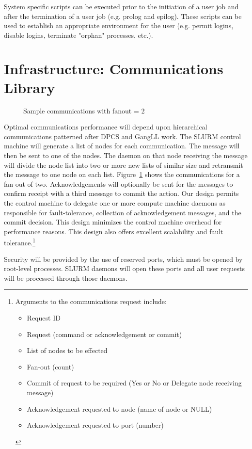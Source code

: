 System specific scripts can be executed prior to the initiation of a user job
and after the termination of a user job (e.g. prolog and epilog). These scripts
can be used to establish an appropriate environment for the user (e.g. permit
logins, disable logins, terminate "orphan" processes, etc.). 

\section{Infrastructure: Communications Library}

\begin{figure}
\caption{Sample communications with fanout = 2}
\label{communicate}
\end{figure}
Optimal communications performance will depend upon hierarchical communications
patterned after DPCS and GangLL work. The SLURM control machine will generate a
list of nodes for each communication. The message will then be sent to one of
the nodes. 
The daemon on that node receiving the message will divide the node list into
two or more new lists of similar size and retransmit the message to one node on
each list. Figure~\ref{communicate} shows the communications for a fan-out of 
two.  Acknowledgements will optionally be sent for the messages to confirm 
receipt with a third message to commit the action. Our design permits the 
control machine to delegate one or more compute machine daemons as responsible 
for fault-tolerance, collection of acknowledgement messages, and the commit
decision. This design minimizes the control machine overhead for performance
reasons. This design also offers excellent scalability and fault 
tolerance.\footnote{Arguments to the communications request include:
\begin{itemize}
\item Request ID
\item Request (command or acknowledgement or commit)
\item List of nodes to be effected
\item Fan-out (count)
\item Commit of request to be required (Yes or No or Delegate node receiving
      message) 
\item Acknowledgement requested to node (name of node or NULL)
\item Acknowledgement requested to port (number)
\end{itemize} }

Security will be provided by the use of reserved ports, which must be opened by
root-level processes. SLURM daemons will open these ports and all user requests
will be processed through those daemons. 

